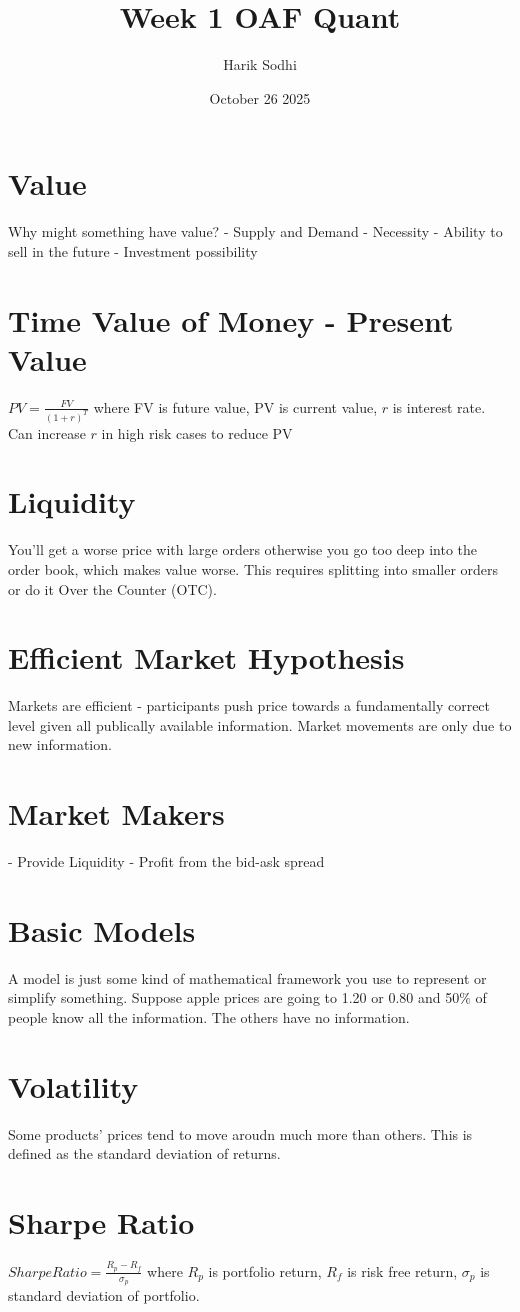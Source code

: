 \documentclass{article}
\title{Week 1 OAF Quant}
\author{Harik Sodhi}
\date{October 26 2025}
\begin{document}
\maketitle
\section{Value}
Why might something have value?
- Supply and Demand
- Necessity
- Ability to sell in the future
- Investment possibility
\section{Time Value of Money - Present Value}
$PV=\frac{FV}{(1+r)^T}$ where FV is future value, PV is current value, $r$ is interest rate.
\newline
Can increase $r$ in high risk cases to reduce PV
\section{Liquidity}
You'll get a worse price with large orders otherwise you go too deep into the order book, which makes value worse. This requires splitting into smaller orders or do it Over the Counter (OTC).
\section{Efficient Market Hypothesis}
Markets are efficient - participants push price towards a fundamentally correct level given all publically available information. Market movements are only due to new information.
\section{Market Makers}
- Provide Liquidity
- Profit from the bid-ask spread
\section{Basic Models}
A model is just some kind of mathematical framework you use to represent or simplify something.
Suppose apple prices are going to 1.20 or 0.80 and 50$\%$ of people know all the information. The others have no information.
\section{Volatility}
Some products' prices tend to move aroudn much more than others.
This is defined as the standard deviation of returns.
\section{Sharpe Ratio}
$Sharpe Ratio=\frac{R_p - R_f}{\sigma_p}$ where $R_p$ is portfolio return, $R_f$ is risk free return, $\sigma_p$ is standard deviation of portfolio.
\end{document}
